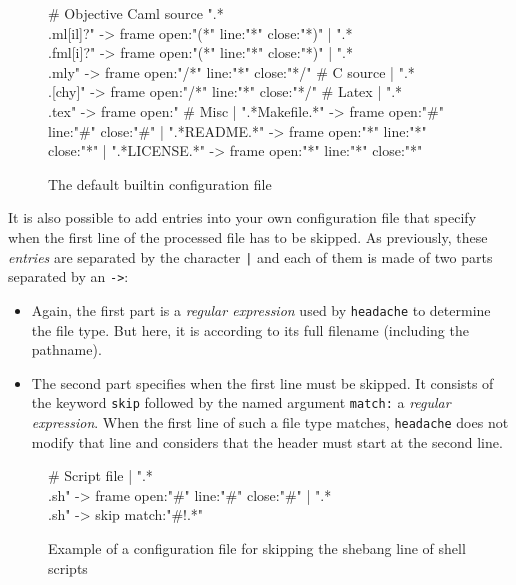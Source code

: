 \documentclass{article}
\newcommand{\mytt}[1]{\texttt{#1}}
\newcommand{\headache}{\mytt{headache}}
\begin{document}
\begin{figure}
\begin{center}
\begin{boxedverbatim}

# Objective Caml source
  ".*\\.ml[il]?" -> frame open:"(*" line:"*" close:"*)"
| ".*\\.fml[i]?" -> frame open:"(*" line:"*" close:"*)"
| ".*\\.mly"     -> frame open:"/*" line:"*" close:"*/"
# C source
| ".*\\.[chy]"    -> frame open:"/*" line:"*" close:"*/"
# Latex
| ".*\\.tex"     -> frame open:"%
# Misc
| ".*Makefile.*" -> frame open:"#"  line:"#" close:"#"
| ".*README.*"   -> frame open:"*"  line:"*" close:"*"
| ".*LICENSE.*"  -> frame open:"*"  line:"*" close:"*"
\end{boxedverbatim}
\end{center}
  \caption{The default builtin configuration file}
  \label{figure:config}
\end{figure}

It is also possible to add entries into your own configuration file that
specify when the first line of the processed file has to be skipped.
As previously, these \emph{entries} are separated by the character \mytt{|}
and each of them is made of two parts separated by an \mytt{->}:
\begin{itemize}
\item Again, the first part is a \emph{regular expression} used by \headache{}
  to determine the file type. But here, it is according to
  its full filename (including the pathname).
\item The second part specifies when the first line must be skipped.
  It consists of the keyword \mytt{skip} followed by the named
  argument \mytt{match:} a \emph{regular expression}.
  When the first line of such a file type matches,
  \headache{} does not modify that line and considers that the header must
  start at the second line.
\end{itemize}

\begin{figure}
\begin{center}
\begin{boxedverbatim}
# Script file
| ".*\\.sh" -> frame open:"#"  line:"#" close:"#"
| ".*\\.sh" -> skip match:"#!.*"
\end{boxedverbatim}
\end{center}
  \caption{Example of a configuration file for skipping the shebang line of shell scripts}
  \label{figure:example}
\end{figure}
\end{document}
